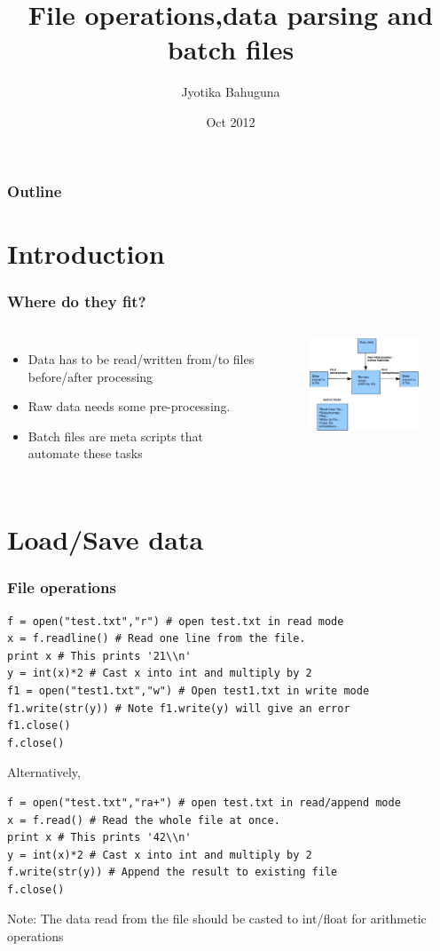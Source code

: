 \documentclass[xcolor=table]{beamer}
\title {File operations,data parsing and batch files}
\author[Jyotika Bahuguna]{Jyotika Bahuguna} %
\institute[BCF]{Bernstein Center Freiburg}
\date[]{Oct 2012}
\begin{document}
\begin{frame} 
\titlepage
\end{frame}


\begin{frame} 
\frametitle{Outline}
\tableofcontents[pausesections]
\end{frame}


\section{Introduction}
\begin{frame}
\frametitle{Where do they fit?}
\begin{columns}
\column{2.0in}
\begin{itemize}
\item Data has to be read/written from/to files before/after processing    
\item Raw data needs some pre-processing.  
\item Batch files are meta scripts that automate these tasks  
\end{itemize}
\column{2.0in}
\begin{figure}
    \centering
    \includegraphics[width=2.0in]{Fits.eps}
\end{figure}
\end{columns}
\end{frame}

\section{Load/Save data}
\begin{frame}[fragile]
\frametitle{File operations}
\tiny
\begin{verbatim}
f = open("test.txt","r") # open test.txt in read mode
x = f.readline() # Read one line from the file. 
print x # This prints '21\\n'
y = int(x)*2 # Cast x into int and multiply by 2
f1 = open("test1.txt","w") # Open test1.txt in write mode
f1.write(str(y)) # Note f1.write(y) will give an error
f1.close()
f.close()
\end{verbatim}
\small
Alternatively,
\tiny
\begin{verbatim}
f = open("test.txt","ra+") # open test.txt in read/append mode
x = f.read() # Read the whole file at once.
print x # This prints '42\\n'
y = int(x)*2 # Cast x into int and multiply by 2
f.write(str(y)) # Append the result to existing file 
f.close()
\end{verbatim}
\small
Note: The data read from the file should be casted to int/float for arithmetic operations
\end{frame}
\end{document}
